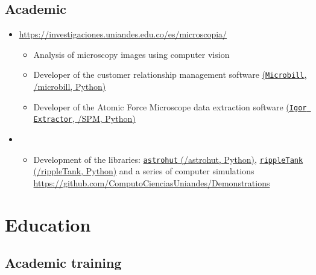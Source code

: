 \documentclass[11pt, letterpaper, sans]{moderncv}        %
\begin{document}
	\subsection{Academic}
		\begin{itemize}
			\item
			{
				{
					\url{https://investigaciones.uniandes.edu.co/es/microscopia/}
					\vspace{3pt}
					\begin{itemize}
						\item Analysis of microscopy images using computer vision
						\item Developer of the customer relationship management software \href{https://github.com/jsbarbosa/microbill}{(\texttt{Microbill}, \faGithub/microbill, {\color{blue} Python})}
						\item Developer of the Atomic Force Microscope data extraction software
						\href{https://github.com/jsbarbosa/SPM}{(\texttt{Igor Extractor}, \faGithub/SPM, {\color{blue} Python})}
					\end{itemize}
				}
			}
			\item
			{
				{
					\vspace{3pt}
					\begin{itemize}
						\item Development of the libraries: \href{https://github.com/jsbarbosa/astrohut}{\texttt{astrohut} (\faGithub/astrohut, {\color{blue} Python})},  \href{https://github.com/jsbarbosa/rippleTank}{\texttt{rippleTank} (\faGithub/rippleTank, {\color{blue} Python})} and a series of computer simulations \url{https://github.com/ComputoCienciasUniandes/Demonstrations}
					\end{itemize} 
				}
			}
		\end{itemize}
	\vspace{6pt}

\section{Education}

\vspace{5pt}

\subsection{Academic training}
\end{document}
